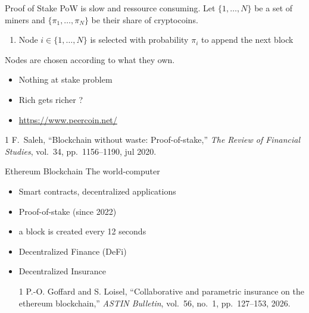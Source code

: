 \documentclass{beamer}
\begin{document}
\begin{frame}{Proof of Stake}
PoW is slow and ressource consuming. Let $\{1,\ldots, N\}$ be a set of miners and $\{\pi_1,\ldots, \pi_N\}$ be their share of cryptocoins.
\begin{tcolorbox}[enhanced,drop shadow, title=PoS]
\begin{enumerate}
\item Node $i\in \{1,\ldots, N\}$ is selected with probability $\pi_i$ to append the next block
\end{enumerate}
\end{tcolorbox}
\vspace{0.3cm}
Nodes are chosen according to what they own.
\begin{itemize}
  \item Nothing at stake problem
  \item Rich gets richer ? 
  \item \url{https://www.peercoin.net/}
\end{itemize}
\footnotesize{
\begin{thebibliography}{1}
F.~Saleh, ``Blockchain without waste: Proof-of-stake,'' {\em The Review of
  Financial Studies}, vol.~34, pp.~1156--1190, jul 2020.
\end{thebibliography}}
\end{frame}

\begin{frame}{Ethereum Blockchain}
The world-computer
\begin{itemize}
  \item Smart contracts, decentralized applications
  \item Proof-of-stake (since 2022)
  \item a block is created every 12 seconds
  \item Decentralized Finance (DeFi)
  \item Decentralized Insurance
   \footnotesize
\begin{thebibliography}{1}
P.-O. Goffard and S. Loisel, ``Collaborative and parametric insurance on the ethereum blockchain,'' {\em ASTIN Bulletin}, vol.~56, no.~1, pp.~127--153, 2026.
\end{thebibliography}
\normalsize
\end{itemize}

\end{frame}
\end{document}
